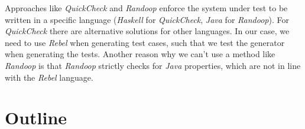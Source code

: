 Approaches like \textit{QuickCheck} \cite{claessen2011quickcheck} and \textit{Randoop} \cite{pacheco2007randoop} enforce the system under test to be written in a specific language (\textit{Haskell} for \textit{QuickCheck}, \textit{Java} for \textit{Randoop}). For \textit{QuickCheck} there are alternative solutions for other languages. In our case, we need to use \textit{Rebel} when generating test cases, such that we test the generator when generating the tests. Another reason why we can't use a method like \textit{Randoop} is that \textit{Randoop} strictly checks for \textit{Java} properties, which are not in line with the \textit{Rebel} language.

\section{Outline}
